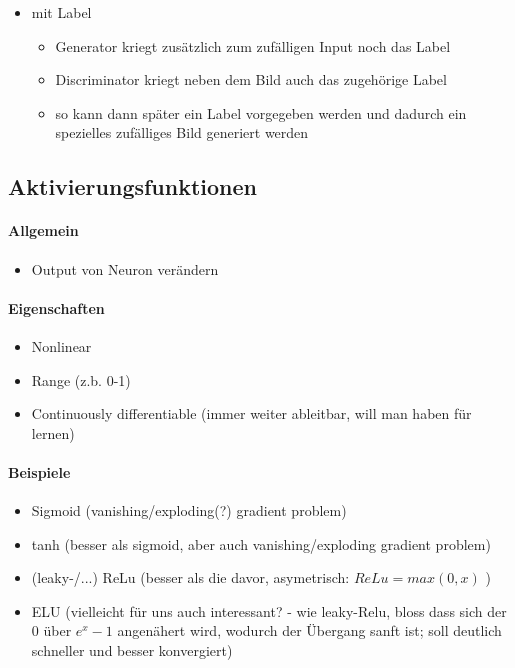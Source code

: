 \begin{itemize}
	\item mit Label
	\begin{itemize}
		\item Generator kriegt zusätzlich zum zufälligen Input noch das Label
		\item Discriminator kriegt neben dem Bild auch das zugehörige Label
		\item so kann dann später ein Label vorgegeben werden und dadurch ein spezielles zufälliges Bild generiert werden
	\end{itemize}
\end{itemize}

\subsection{Aktivierungsfunktionen}
\paragraph{Allgemein  \cite{activation-function}}
\begin{itemize}
	\item Output von Neuron verändern
\end{itemize}

\paragraph{Eigenschaften}
\begin{itemize}
	\item Nonlinear
	\item Range (z.b. 0-1)
	\item Continuously differentiable (immer weiter ableitbar, will man haben für lernen)
\end{itemize}

\paragraph{Beispiele}
\begin{itemize}
	\item Sigmoid (vanishing/exploding(?) gradient problem)
	\item tanh (besser als sigmoid, aber auch vanishing/exploding gradient problem)
	\item (leaky-/...) ReLu (besser als die davor, asymetrisch: $ReLu=max(0, x)$ )
	\item ELU (vielleicht für uns auch interessant? - wie leaky-Relu, bloss dass sich der 0 über $e^x - 1$ angenähert wird, wodurch der Übergang sanft ist; soll deutlich schneller und besser konvergiert)
\end{itemize}

